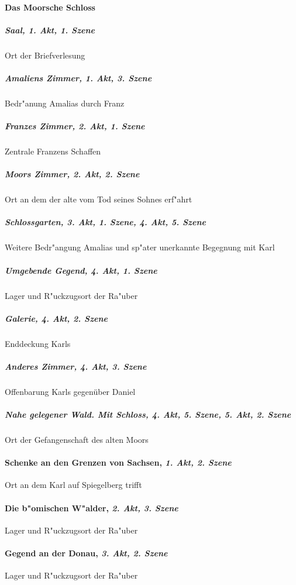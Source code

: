 \paragraph{Das Moorsche Schloss}
	\subparagraph{Saal, \textit{1. Akt, 1. Szene}}
		Ort der Briefverlesung
	\subparagraph{Amaliens Zimmer, \textit{1. Akt, 3. Szene}}
		Bedr"anung Amalias durch Franz
	\subparagraph{Franzes Zimmer, \textit{2. Akt, 1. Szene}}
		Zentrale Franzens Schaffen
	\subparagraph{Moors Zimmer, \textit{2. Akt, 2. Szene}}
		Ort an dem der alte vom Tod seines Sohnes erf"ahrt
	\subparagraph{Schlossgarten, \textit{3. Akt, 1. Szene}, \textit{4. Akt, 5. Szene}}
		Weitere Bedr"angung Amalias und sp"ater unerkannte Begegnung mit Karl
	\subparagraph{Umgebende Gegend, \textit{4. Akt, 1. Szene}}
		Lager und R"uckzugsort der Ra"uber
	\subparagraph{Galerie, \textit{4. Akt, 2. Szene}}
		Enddeckung Karls
	\subparagraph{Anderes Zimmer, \textit{4. Akt, 3. Szene}}
		Offenbarung Karls gegenüber Daniel
	\subparagraph{Nahe gelegener Wald. Mit Schloss, \textit{4. Akt, 5. Szene}, \textit{5. Akt, 2. Szene}}
		Ort der Gefangenschaft des alten Moors
\paragraph{Schenke an den Grenzen von Sachsen, \textit{1. Akt, 2. Szene}}
Ort an dem Karl auf Spiegelberg trifft
\paragraph{Die b"omischen W"alder, \textit{2. Akt, 3. Szene}}
Lager und R"uckzugsort der Ra"uber
\paragraph{Gegend an der Donau, \textit{3. Akt, 2. Szene}}
Lager und R"uckzugsort der Ra"uber
